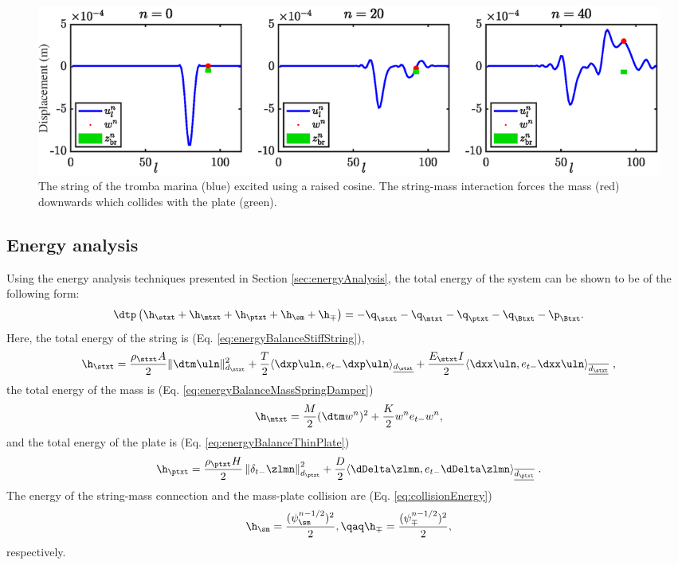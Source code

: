 \begin{figure}[h]
    \centering
    \includegraphics[width=\textwidth]{figures/contributions/tromba/trombaExcite.eps}
    \caption{The string of the tromba marina (blue) excited using a raised cosine. The string-mass interaction forces the mass (red) downwards which collides with the plate (green). \label{fig:trombaExcite}}
\end{figure}

\subsection{Energy analysis}
Using the energy analysis techniques presented in Section \ref{sec:energyAnalysis}, the total energy of the system can be shown to be of the following form:
\begin{equation}
    \dtp\left(\h_\stxt + \h_\mtxt + \h_\ptxt + \h_\sm + \h_\mp\right) = -\q_\stxt - \q_\mtxt - \q_\ptxt - \q_\Btxt - \p_\Btxt.
\end{equation}
Here, the total energy of the string is (Eq. \eqref{eq:energyBalanceStiffString}),
\begin{equation*}
    \begin{gathered}
        \h_\stxt = \frac{\rho_\stxt A}{2}\lVert\dtm \uln\rVert^2_{d_\stxt} + \frac{T}{2}\langle\dxp\uln, e_{t-}\dxp\uln\rangle_{\underline{d_\stxt}} + \frac{E_\stxt I}{2}\langle\dxx\uln, e_{t-}\dxx\uln\rangle_{\overline{\underline{d_\stxt}}}\ ,
    \end{gathered}
\end{equation*}
the total energy of the mass is (Eq. \eqref{eq:energyBalanceMassSpringDamper}) 
\begin{equation*}
    \h_\mtxt = \frac{M}{2}(\dtm w^n)^2 + \frac{K}{2}w^n e_{t-}w^n,
\end{equation*}
and the total energy of the plate is (Eq. \eqref{eq:energyBalanceThinPlate})
\begin{equation*}
    \h_\ptxt = \frac{\rho_\ptxt H}{2} \left\lVert\delta_{t-}\zlmn\right\rVert_{d_\ptxt}^2 + \frac{D}{2}\langle\dDelta \zlmn, e_{t-}\dDelta \zlmn\rangle_{\overline{\underline{d_\ptxt}}}\ .
\end{equation*}
The energy of the string-mass connection and the mass-plate collision are (Eq. \eqref{eq:collisionEnergy})
\begin{equation*}
    \h_\sm = \frac{(\psi_\sm^{n-1/2})^2}{2}, \qaq \h_\mp = \frac{(\psi_\mp^{n-1/2})^2}{2},
\end{equation*}
respectively.

